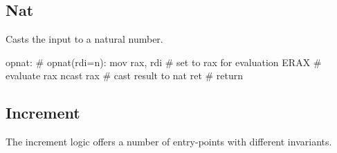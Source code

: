 \subsection{Nat}

Casts the input to a natural number.

\begin{asm}
opnat:                                      # opnat(rdi=n):
	mov	rax, rdi                    #   set to rax for evaluation
	ERAX                                #   evaluate rax
	ncast	rax                         #   cast result to nat
	ret                                 #   return
\end{asm}

\subsection{Increment}

The increment logic offers a number of entry-points with different
invariants.

